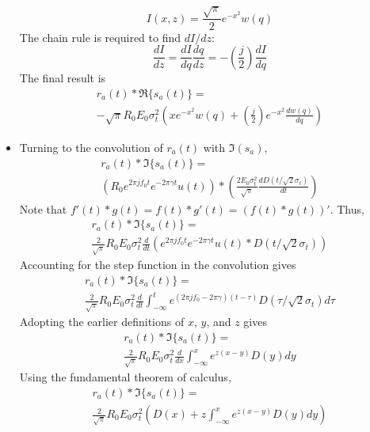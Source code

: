 \documentclass[amsmath,amssymb,aps,prd,10pt,twocolumn,showkeys]{revtex4}
\begin{document}
\begin{itemize}
\begin{equation}
I(x,z) = \frac{\sqrt{\pi}}{2} e^{-x^2} w(q)
\end{equation}
The chain rule is required to find $dI/dz$:
\begin{equation}
\frac{dI}{dz} = \frac{dI}{dq}\frac{dq}{dz} = -\left(\frac{j}{2}\right)\frac{dI}{dq}
\end{equation}
The final result is
\begin{multline}
r_a(t) * \Re\lbrace s_a(t) \rbrace = \\ -\sqrt{\pi} R_0 E_0 \sigma_t^2 \left(x e^{-x^2} w(q) + \left(\frac{j}{2}\right) e^{-x^2} \frac{dw(q)}{dq} \right) \label{eq:Re_result}
\end{multline}
\item Turning to the convolution of $r_a(t)$ with $\Im(s_a)$,
\begin{multline}
r_a(t) * \Im\lbrace s_a(t) \rbrace = \\ \left(R_0 e^{2\pi j f_0 t} e^{-2\pi \gamma t} u(t)\right) * \left(\frac{2 E_0 \sigma_t^2}{\sqrt{\pi}}\frac{dD(t/\sqrt{2}\sigma_t)}{dt} \right)
\end{multline}
Note that $f'(t) * g(t) = f(t) * g'(t) = (f(t) * g(t))'$.  Thus,
\begin{multline}
r_a(t) * \Im\lbrace s_a(t) \rbrace = \\ \frac{2}{\sqrt{\pi}} R_0 E_0 \sigma_t^2 \frac{d}{dt}\left(e^{2\pi j f_0 t}e^{-2\pi\gamma t} u(t) * D(t/\sqrt{2}\sigma_t) \right)
\end{multline}
Accounting for the step function in the convolution gives
\begin{multline}
r_a(t) * \Im\lbrace s_a(t) \rbrace = \\ \frac{2}{\sqrt{\pi}} R_0 E_0 \sigma_t^2 \frac{d}{dt} \int_{-\infty}^{t} e^{(2\pi j f_0 - 2\pi\gamma)(t-\tau)}D(\tau/\sqrt{2}\sigma_t)d\tau
\end{multline}
Adopting the earlier definitions of $x$, $y$, and $z$ gives
\begin{multline}
r_a(t) * \Im\lbrace s_a(t) \rbrace = \\ \frac{2}{\sqrt{\pi}} R_0 E_0 \sigma_t^2 \frac{d}{dx} \int_{-\infty}^{x} e^{z(x-y)} D(y) dy
\end{multline}
Using the fundamental theorem of calculus, 
\begin{multline}
r_a(t) * \Im\lbrace s_a(t) \rbrace = \\ \frac{2}{\sqrt{\pi}} R_0 E_0 \sigma_t^2 \left(D(x) + z\int_{-\infty}^{x} e^{z(x-y)} D(y) dy \right)
\end{multline}

\end{itemize}
\end{document}
